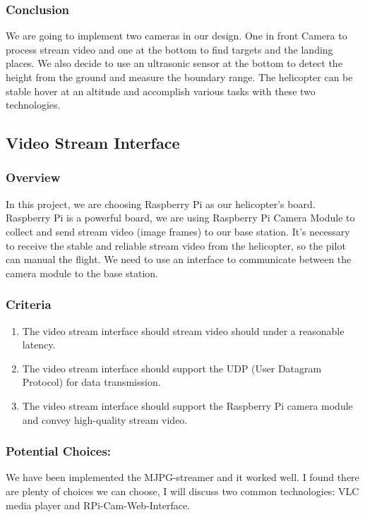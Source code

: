 \documentclass[onecolumn, draftclsnofoot,10pt, compsoc]{IEEEtran}
\begin{document}
\subsubsection{Conclusion}
We are going to implement two cameras in our design. One in front Camera to process stream video and one at the bottom to find targets and the landing places. We also decide to use an ultrasonic sensor at the bottom to detect the height from the ground and measure the boundary range. The helicopter can be stable hover at an altitude and accomplish various tasks with these two technologies.


\subsection{Video Stream Interface}
\subsubsection{Overview}
In this project, we are choosing Raspberry Pi as our helicopter’s board. Raspberry Pi is a powerful board, we are using Raspberry Pi Camera Module to collect and send stream video (image frames) to our base station. It’s necessary to receive the stable and reliable stream video from the helicopter, so the pilot can manual the flight. We need to use an interface to communicate between the camera module to the base station.

\subsubsection{Criteria}
\begin{enumerate}
\item{The video stream interface should stream video should under a reasonable latency.}
\item{The video stream interface should support the UDP (User Datagram Protocol) for data transmission.}
\item{The video stream interface should support the Raspberry Pi camera module and convey high-quality stream video.}
\end{enumerate}

\subsubsection{Potential Choices:}
We have been implemented the MJPG-streamer and it worked well. I found there are plenty of choices we can choose, I will discuss two common technologies: VLC media player and RPi-Cam-Web-Interface.
\end{document}
